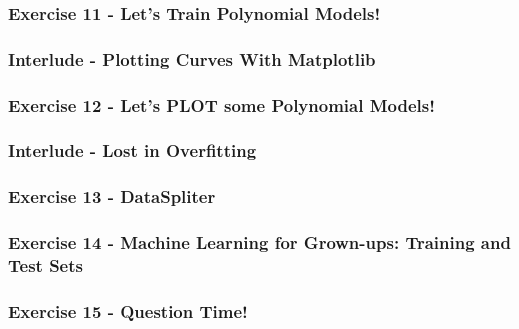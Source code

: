 \documentclass[]{article}
\begin{document}
\hypertarget{exercise-11---lets-train-polynomial-models}{%
\subsubsection{Exercise 11 - Let's Train Polynomial
Models!}\label{exercise-11---lets-train-polynomial-models}}

\hypertarget{interlude---plotting-curves-with-matplotlib}{%
\subsubsection{Interlude - Plotting Curves With
Matplotlib}\label{interlude---plotting-curves-with-matplotlib}}

\hypertarget{exercise-12---lets-plot-some-polynomial-models}{%
\subsubsection{Exercise 12 - Let's PLOT some Polynomial
Models!}\label{exercise-12---lets-plot-some-polynomial-models}}

\hypertarget{interlude---lost-in-overfitting}{%
\subsubsection{Interlude - Lost in
Overfitting}\label{interlude---lost-in-overfitting}}

\hypertarget{exercise-13---dataspliter}{%
\subsubsection{Exercise 13 -
DataSpliter}\label{exercise-13---dataspliter}}

\hypertarget{exercise-14---machine-learning-for-grown-ups-training-and-test-sets}{%
\subsubsection{Exercise 14 - Machine Learning for Grown-ups: Training
and Test
Sets}\label{exercise-14---machine-learning-for-grown-ups-training-and-test-sets}}

\hypertarget{exercise-15---question-time}{%
\subsubsection{Exercise 15 - Question
Time!}\label{exercise-15---question-time}}

\clearpage
\end{document}
